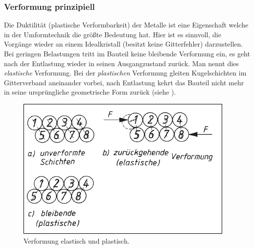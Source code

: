 \documentclass[12pt,a4paper,parskip,twoside,BCOR5mm,headsepline]{scrartcl}
\begin{document}
\begin{description*}
\begin{itemize*}
\subsubsection{Verformung prinzipiell}
Die Duktilität (plastische Verformbarkeit) der Metalle ist eine Eigenschaft welche in der Umformtechnik die größte Bedeutung hat. Hier ist es sinnvoll, die Vorgänge wieder an einem Idealkristall (besitzt keine Gitterfehler) darzustellen. Bei geringen Belastungen tritt im Bauteil keine bleibende Verformung ein, es geht nach  der Entlastung wieder in seinen Ausgangzustand zurück. Man nennt dies \emph{elastische} Verformung. Bei der \emph{plastischen} Verformung gleiten Kugelschichten im Gitterverband aneinander vorbei,  nach Entlastung kehrt das Bauteil nicht mehr in seine ursprüngliche geometrische Form zurück (siehe ).
\begin{figure}
\centering
\includegraphics[width=.8\textwidth]{eloplastkristall}
\caption[Verformung elastisch und plastisch]{Verformung elastisch und plastisch. \autocite[45]{wk}}
\label{fig:eloplastkristall} 
\end{figure}


\end{itemize*}
\end{description*}
\end{document}
